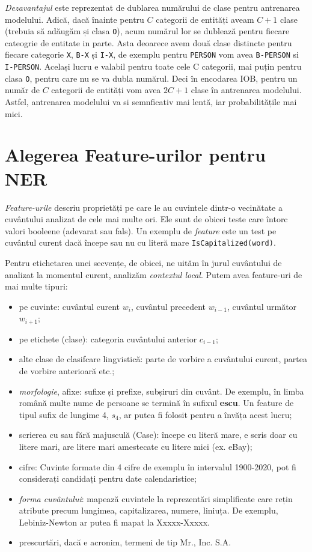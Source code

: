 \textit{Dezavantajul} este reprezentat de dublarea numărului de clase pentru antrenarea modelului. Adică, dacă înainte pentru $C$ categorii de entități aveam $C + 1 $ clase (trebuia să adăugăm și clasa \texttt{O}), acum numărul lor se dublează pentru fiecare cateogrie de entitate in parte. Asta deoarece avem două clase distincte pentru fiecare categorie \texttt{X}, \texttt{B-X} și \texttt{I-X}, de exemplu pentru \texttt{PERSON} vom avea \texttt{B-PERSON} si \texttt{I-PERSON}. Același lucru e valabil pentru toate cele C categorii, mai puțin pentru clasa \texttt{O}, pentru care nu se va dubla numărul. Deci în encodarea IOB, pentru un număr de $C$ categorii de entități vom avea $2C + 1 $ clase în antrenarea modelului. Astfel, antrenarea modelului va si semnficativ mai lentă, iar probabilitățile mai mici.

\section{Alegerea Feature-urilor pentru NER}

\textit{Feature-urile} descriu proprietăți pe care le au cuvintele dintr-o vecinătate a cuvântului analizat de cele mai multe ori. Ele sunt de obicei teste care întorc valori booleene (adevarat sau fals). Un exemplu de \textit{feature} este un test pe cuvântul curent dacă începe sau nu cu literă mare \texttt{IsCapitalized(word)}.

Pentru etichetarea unei secvențe, de obicei, ne uităm în jurul cuvântului de analizat la momentul curent, analizăm \textit{contextul local}. Putem avea feature-uri de mai multe tipuri:

\begin{itemize}
\item pe cuvinte: cuvântul curent $w_i$, cuvântul precedent $w_{i-1}$, cuvântul următor $w_{i+1}$;
\item pe etichete (clase): categoria cuvântului anterior $c_{i-1}$;
\item alte clase de clasifcare lingvistică: parte de vorbire a cuvântului curent, partea de vorbire anterioară etc.;
\item \textit{morfologie}, afixe: sufixe și prefixe, subșiruri din cuvânt. De exemplu, în limba română multe nume de persoane se termină în sufixul \textbf{escu}. Un feature de tipul sufix de lungime 4, $s_4$, ar putea fi folosit pentru a învăța acest lucru;
\item scrierea cu sau fără majusculă (Case): începe cu literă mare, e scris doar cu litere mari, are litere mari amestecate cu litere mici (ex. eBay);
\item cifre: Cuvinte formate din 4 cifre de exemplu  în intervalul 1900-2020, pot fi considerați candidați pentru date calendaristice;
\item \textit{forma cuvântului}: mapează cuvintele la reprezentări simplificate care rețin atribute precum lungimea, capitalizarea, numere, liniuța. De exemplu, Lebiniz-Newton ar putea fi mapat la Xxxxx-Xxxxx.
\item prescurtări, dacă e acronim, termeni de tip Mr., Inc. S.A.

\end{itemize}

